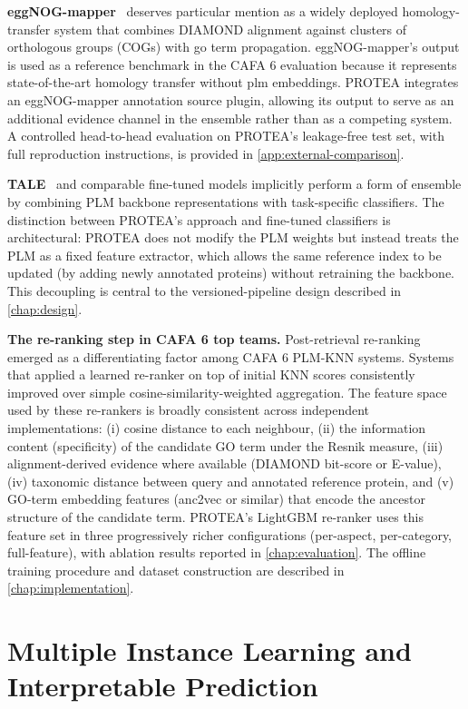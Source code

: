 \textbf{eggNOG-mapper}~\cite{cantalapiedra2021eggnogmapper} deserves particular
mention as a widely deployed homology-transfer system that combines DIAMOND
alignment against clusters of orthologous groups (COGs) with \gls{go} term
propagation. eggNOG-mapper's output is used as a reference benchmark in the
CAFA 6 evaluation because it represents state-of-the-art homology transfer
without \gls{plm} embeddings. PROTEA integrates an eggNOG-mapper annotation source
plugin, allowing its output to serve as an additional evidence channel in the
ensemble rather than as a competing system. A controlled head-to-head
evaluation on PROTEA's leakage-free test set, with full reproduction
instructions, is provided in \cref{app:external-comparison}.

\textbf{TALE}~\cite{tale2023} and comparable fine-tuned models implicitly
perform a form of ensemble by combining PLM backbone representations with
task-specific classifiers. The distinction between PROTEA's approach and
fine-tuned classifiers is architectural: PROTEA does not modify the PLM weights
but instead treats the PLM as a fixed feature extractor, which allows the same
reference index to be updated (by adding newly annotated proteins) without
retraining the backbone. This decoupling is central to the versioned-pipeline
design described in \cref{chap:design}.

\textbf{The re-ranking step in CAFA 6 top teams.} Post-retrieval re-ranking
emerged as a differentiating factor among CAFA 6 PLM-KNN systems. Systems that
applied a learned re-ranker on top of initial KNN scores consistently improved
over simple cosine-similarity-weighted aggregation. The feature space used by
these re-rankers is broadly consistent across independent implementations: (i)
cosine distance to each neighbour, (ii) the information content (specificity) of
the candidate GO term under the Resnik measure, (iii) alignment-derived evidence
where available (DIAMOND bit-score or E-value), (iv) taxonomic distance between
query and annotated reference protein, and (v) GO-term embedding features
(anc2vec or similar) that encode the ancestor structure of the candidate term.
PROTEA's LightGBM re-ranker uses this feature set in three progressively richer
configurations (per-aspect, per-category, full-feature), with ablation results
reported in \cref{chap:evaluation}. The offline training procedure and dataset construction
are described in \cref{chap:implementation}.

\section{Multiple Instance Learning and Interpretable Prediction}
\label{sec:related-mil}

